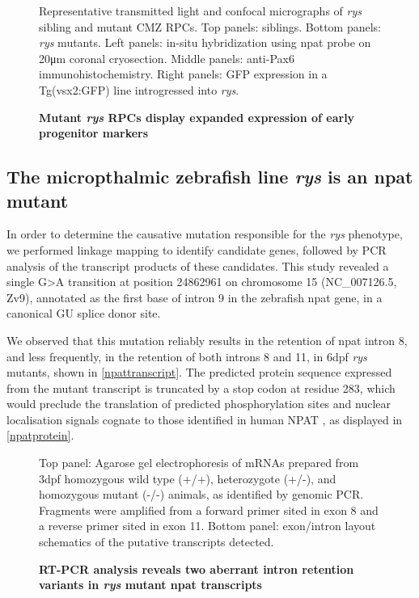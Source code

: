 \begin{figure}[!h]
    \caption{{\bf Mutant \textit{rys} RPCs display expanded expression of early progenitor markers}}
    Representative transmitted light and confocal micrographs of \textit{rys} sibling and mutant CMZ RPCs. Top panels: siblings. Bottom panels: \textit{rys} mutants. Left panels: in-situ hybridization using npat probe on 20\si{\micro\metre} coronal cryosection. Middle panels: anti-Pax6 immunohistochemistry. Right panels: GFP expression in a Tg(vsx2:GFP) line introgressed into \textit{rys}. 
    \label{progenitoridentity}
\end{figure}

\FloatBarrier
\subsection{The micropthalmic zebrafish line \textit{rys} is an npat mutant}

In order to determine the causative mutation responsible for the \textit{rys} phenotype, we performed linkage mapping to identify candidate genes, followed by PCR analysis of the transcript products of these candidates. This study revealed a single G\textgreater{}A transition at position 24862961 on chromosome 15 (NC\_007126.5, Zv9), annotated as the first base of intron 9 in the zebrafish npat gene, in a canonical GU splice donor site. 

We observed that this mutation reliably results in the retention of npat intron 8, and less frequently, in the retention of both introns 8 and 11, in 6dpf \textit{rys} mutants, shown in \autoref{npattranscript}. The predicted protein sequence expressed from the mutant transcript is truncated by a stop codon at residue 283, which would preclude the translation of predicted phosphorylation sites and nuclear localisation signals cognate to those identified in human NPAT \cite{Ma2000,Sagara2002}, as displayed in \autoref{npatprotein}.

\begin{figure}[!h]
    \caption{{\bf RT-PCR analysis reveals two aberrant intron retention variants in \textit{rys} mutant npat transcripts}}
    \label{npattranscript}
    Top panel: Agarose gel electrophoresis of mRNAs prepared from 3dpf homozygous wild type (+/+), heterozygote (+/-), and homozygous mutant (-/-) animals, as identified by genomic PCR. Fragments were amplified from a forward primer sited in exon 8 and a reverse primer sited in exon 11.
    Bottom panel: exon/intron layout schematics of the putative transcripts detected.
\end{figure}

